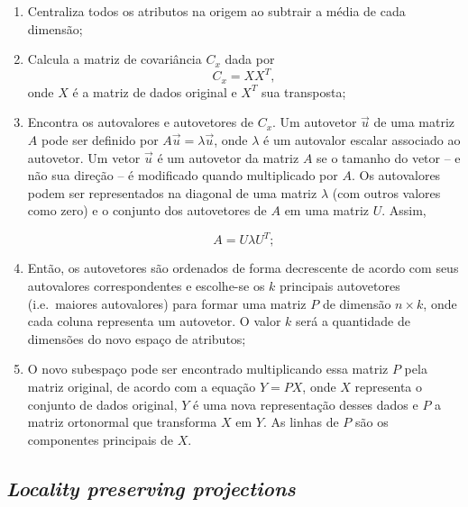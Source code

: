 \begin{enumerate}
\item Centraliza todos os atributos na origem ao subtrair a média de cada dimensão;
\item Calcula a matriz de covariância $C_x$ dada por
\begin{equation}
    C_x = X X^T,
\end{equation}
\noindent onde $X$ é a matriz de dados original e $X^T$ sua transposta;

\item Encontra os autovalores e autovetores de $C_x$. Um autovetor $\vec{u}$ de uma matriz $A$ pode ser definido por $A\vec{u} = \lambda \vec{u}$, onde $\lambda$ é um autovalor escalar associado ao autovetor. Um vetor $\vec{u}$ é um autovetor da matriz $A$ se o tamanho do vetor -- e não sua direção -- é modificado quando multiplicado por $A$. Os autovalores podem ser representados na diagonal de uma matriz $\lambda$ (com outros valores como zero) e o conjunto dos autovetores de $A$ em uma matriz $U$. Assim,

\begin{equation}
    A = U \lambda U^T;
\end{equation}

\item Então, os autovetores são ordenados de forma decrescente de acordo com seus autovalores correspondentes e escolhe-se os $k$ principais autovetores (i.e.\ maiores autovalores) para formar uma matriz $P$ de dimensão $n \times k$, onde cada coluna representa um autovetor. O valor $k$ será a quantidade de dimensões do novo espaço de atributos;
\item O novo subespaço pode ser encontrado multiplicando essa matriz $P$ pela matriz original, de acordo com a equação $Y = PX$, onde $X$ representa o conjunto de dados original, $Y$ é uma nova representação desses dados e $P$ a matriz ortonormal que transforma $X$ em $Y$. As linhas de $P$ são os componentes principais de $X$.
\end{enumerate}

\subsection{\textit{Locality preserving projections}}
\label{sec:lpp}


